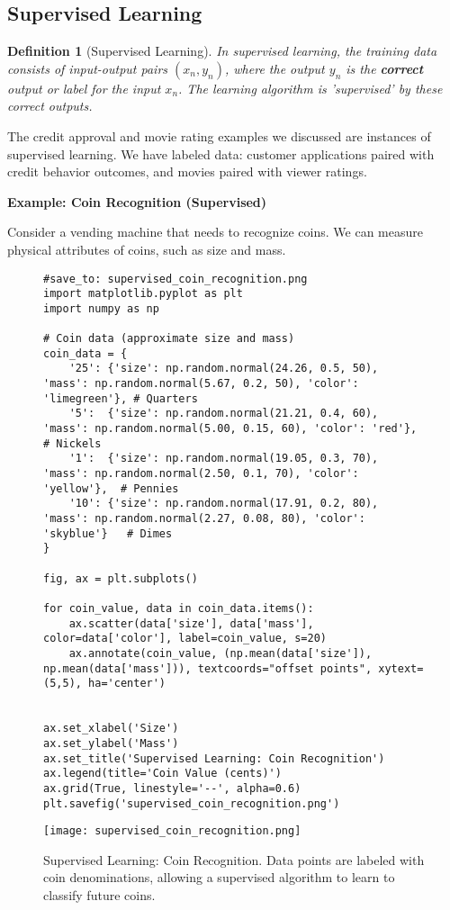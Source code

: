 \documentclass{article}
\newtheorem{definition}{Definition}
\begin{document}
\subsection{Supervised Learning}

\begin{definition}[Supervised Learning]
    In supervised learning, the training data consists of input-output pairs \((x_n, y_n)\), where the output \(y_n\) is the \textbf{correct} output or label for the input \(x_n\).  The learning algorithm is 'supervised' by these correct outputs.
\end{definition}

The credit approval and movie rating examples we discussed are instances of supervised learning. We have labeled data: customer applications paired with credit behavior outcomes, and movies paired with viewer ratings.

\textbf{Example: Coin Recognition (Supervised)}

Consider a vending machine that needs to recognize coins. We can measure physical attributes of coins, such as size and mass.

\begin{figure}[H]
    \centering
    \begin{verbatim}
#save_to: supervised_coin_recognition.png
import matplotlib.pyplot as plt
import numpy as np

# Coin data (approximate size and mass)
coin_data = {
    '25': {'size': np.random.normal(24.26, 0.5, 50), 'mass': np.random.normal(5.67, 0.2, 50), 'color': 'limegreen'}, # Quarters
    '5':  {'size': np.random.normal(21.21, 0.4, 60), 'mass': np.random.normal(5.00, 0.15, 60), 'color': 'red'},     # Nickels
    '1':  {'size': np.random.normal(19.05, 0.3, 70), 'mass': np.random.normal(2.50, 0.1, 70), 'color': 'yellow'},  # Pennies
    '10': {'size': np.random.normal(17.91, 0.2, 80), 'mass': np.random.normal(2.27, 0.08, 80), 'color': 'skyblue'}   # Dimes
}

fig, ax = plt.subplots()

for coin_value, data in coin_data.items():
    ax.scatter(data['size'], data['mass'], color=data['color'], label=coin_value, s=20)
    ax.annotate(coin_value, (np.mean(data['size']), np.mean(data['mass'])), textcoords="offset points", xytext=(5,5), ha='center')


ax.set_xlabel('Size')
ax.set_ylabel('Mass')
ax.set_title('Supervised Learning: Coin Recognition')
ax.legend(title='Coin Value (cents)')
ax.grid(True, linestyle='--', alpha=0.6)
plt.savefig('supervised_coin_recognition.png')
    \end{verbatim}
    \centering
    \texttt{[image: supervised\_coin\_recognition.png]}
    \caption{Supervised Learning: Coin Recognition.  Data points are labeled with coin denominations, allowing a supervised algorithm to learn to classify future coins.}
    \label{fig:supervised_coin_recognition}
\end{figure}
\end{document}
